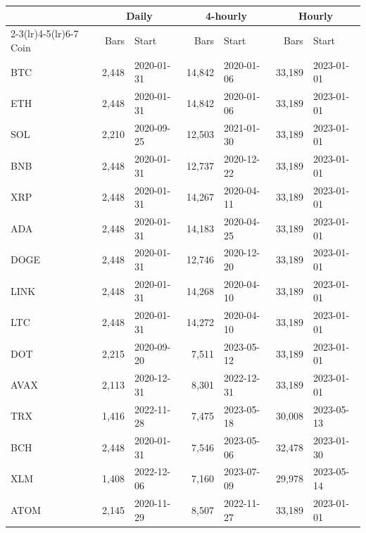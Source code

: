 \begin{tabular}{lrlrlrl}
\toprule
 & \multicolumn{2}{c}{Daily} & \multicolumn{2}{c}{4-hourly} & \multicolumn{2}{c}{Hourly} \\
\cmidrule(lr){2-3}\cmidrule(lr){4-5}\cmidrule(lr){6-7}
Coin & Bars & Start & Bars & Start & Bars & Start \\
\midrule
BTC & 2,448 & 2020-01-31 & 14,842 & 2020-01-06 & 33,189 & 2023-01-01 \\
ETH & 2,448 & 2020-01-31 & 14,842 & 2020-01-06 & 33,189 & 2023-01-01 \\
SOL & 2,210 & 2020-09-25 & 12,503 & 2021-01-30 & 33,189 & 2023-01-01 \\
BNB & 2,448 & 2020-01-31 & 12,737 & 2020-12-22 & 33,189 & 2023-01-01 \\
XRP & 2,448 & 2020-01-31 & 14,267 & 2020-04-11 & 33,189 & 2023-01-01 \\
ADA & 2,448 & 2020-01-31 & 14,183 & 2020-04-25 & 33,189 & 2023-01-01 \\
DOGE & 2,448 & 2020-01-31 & 12,746 & 2020-12-20 & 33,189 & 2023-01-01 \\
LINK & 2,448 & 2020-01-31 & 14,268 & 2020-04-10 & 33,189 & 2023-01-01 \\
LTC & 2,448 & 2020-01-31 & 14,272 & 2020-04-10 & 33,189 & 2023-01-01 \\
DOT & 2,215 & 2020-09-20 & 7,511 & 2023-05-12 & 33,189 & 2023-01-01 \\
AVAX & 2,113 & 2020-12-31 & 8,301 & 2022-12-31 & 33,189 & 2023-01-01 \\
TRX & 1,416 & 2022-11-28 & 7,475 & 2023-05-18 & 30,008 & 2023-05-13 \\
BCH & 2,448 & 2020-01-31 & 7,546 & 2023-05-06 & 32,478 & 2023-01-30 \\
XLM & 1,408 & 2022-12-06 & 7,160 & 2023-07-09 & 29,978 & 2023-05-14 \\
ATOM & 2,145 & 2020-11-29 & 8,507 & 2022-11-27 & 33,189 & 2023-01-01 \\
\bottomrule
\end{tabular}
